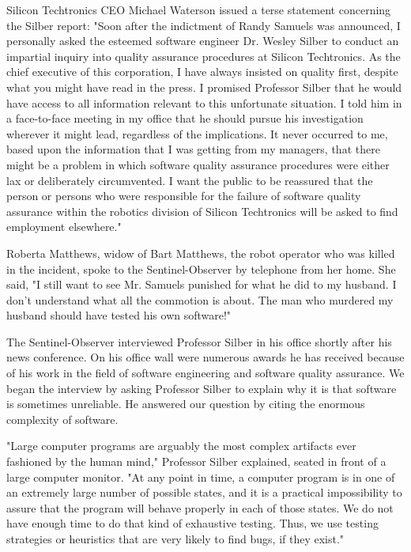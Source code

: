 Silicon Techtronics CEO Michael Waterson issued a terse statement concerning the Silber report: "Soon after the indictment of Randy Samuels was announced, I personally asked the esteemed software engineer Dr. Wesley Silber to conduct an impartial inquiry into quality assurance procedures at Silicon Techtronics. As the chief executive of this corporation, I have always insisted on quality first, despite what you might have read in the press. I promised Professor Silber that he would have access to all information relevant to this unfortunate situation. I told him in a face-to-face meeting in my office that he should pursue his investigation wherever it might lead, regardless of the implications. It never occurred to me, based upon the information that I was getting from my managers, that there might be a problem in which software quality assurance procedures were either lax or deliberately circumvented. I want the public to be reassured that the person or persons who were responsible for the failure of software quality assurance within the robotics division of Silicon Techtronics will be asked to find employment elsewhere."

Roberta Matthews, widow of Bart Matthews, the robot operator who was killed in the incident, spoke to the Sentinel-Observer by telephone from her home. She said, "I still want to see Mr. Samuels punished for what he did to my husband. I don't understand what all the commotion is about. The man who murdered my husband should have tested his own software!"

The Sentinel-Observer interviewed Professor Silber in his office shortly after his news conference. On his office wall were numerous awards he has received because of his work in the field of software engineering and software quality assurance. We began the interview by asking Professor Silber to explain why it is that software is sometimes unreliable. He answered our question by citing the enormous complexity of software.

"Large computer programs are arguably the most complex artifacts ever fashioned by the human mind," Professor Silber explained, seated in front of a large computer monitor. "At any point in time, a computer program is in one of an extremely large number of possible states, and it is a practical impossibility to assure that the program will behave properly in each of those states. We do not have enough time to do that kind of exhaustive testing. Thus, we use testing strategies or heuristics that are very likely to find bugs, if they exist."

